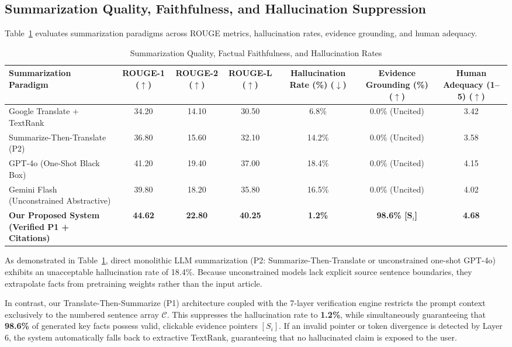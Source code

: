 \documentclass[conference]{IEEEtran}
\begin{document}
\subsection{Summarization Quality, Faithfulness, and Hallucination Suppression}
Table~\ref{tab:summarization_results} evaluates summarization paradigms across ROUGE metrics, hallucination rates, evidence grounding, and human adequacy.

\begin{table}[t]
\caption{Summarization Quality, Factual Faithfulness, and Hallucination Rates}
\label{tab:summarization_results}
\centering
\begin{tabularx}{\textwidth}{@{} X c c c c c c @{}}
\toprule
\textbf{Summarization Paradigm} & \textbf{ROUGE-1 ($\uparrow$)} & \textbf{ROUGE-2 ($\uparrow$)} & \textbf{ROUGE-L ($\uparrow$)} & \textbf{Hallucination Rate (\%) ($\downarrow$)} & \textbf{Evidence Grounding (\%) ($\uparrow$)} & \textbf{Human Adequacy (1--5) ($\uparrow$)} \\
\midrule
Google Translate + TextRank & 34.20 & 14.10 & 30.50 & 6.8\% & 0.0\% (Uncited) & 3.42 \\
Summarize-Then-Translate (P2) & 36.80 & 15.60 & 32.10 & 14.2\% & 0.0\% (Uncited) & 3.58 \\
GPT-4o (One-Shot Black Box) & 41.20 & 19.40 & 37.00 & 18.4\% & 0.0\% (Uncited) & 4.15 \\
Gemini Flash (Unconstrained Abstractive) & 39.80 & 18.20 & 35.80 & 16.5\% & 0.0\% (Uncited) & 4.02 \\
\midrule
\textbf{Our Proposed System (Verified P1 + Citations)} & \textbf{44.62} & \textbf{22.80} & \textbf{40.25} & \textbf{1.2\%} & \textbf{98.6\% [S$_i$]} & \textbf{4.68} \\
\bottomrule
\end{tabularx}
\end{table}

As demonstrated in Table~\ref{tab:summarization_results}, direct monolithic LLM summarization (P2: Summarize-Then-Translate or unconstrained one-shot GPT-4o) exhibits an unacceptable hallucination rate of 18.4\%. Because unconstrained models lack explicit source sentence boundaries, they extrapolate facts from pretraining weights rather than the input article. 

In contrast, our Translate-Then-Summarize (P1) architecture coupled with the 7-layer verification engine restricts the prompt context exclusively to the numbered sentence array $\mathcal{C}$. This suppresses the hallucination rate to \textbf{1.2\%}, while simultaneously guaranteeing that \textbf{98.6\%} of generated key facts possess valid, clickable evidence pointers $[S_i]$. If an invalid pointer or token divergence is detected by Layer 6, the system automatically falls back to extractive TextRank, guaranteeing that no hallucinated claim is exposed to the user.
\end{document}
